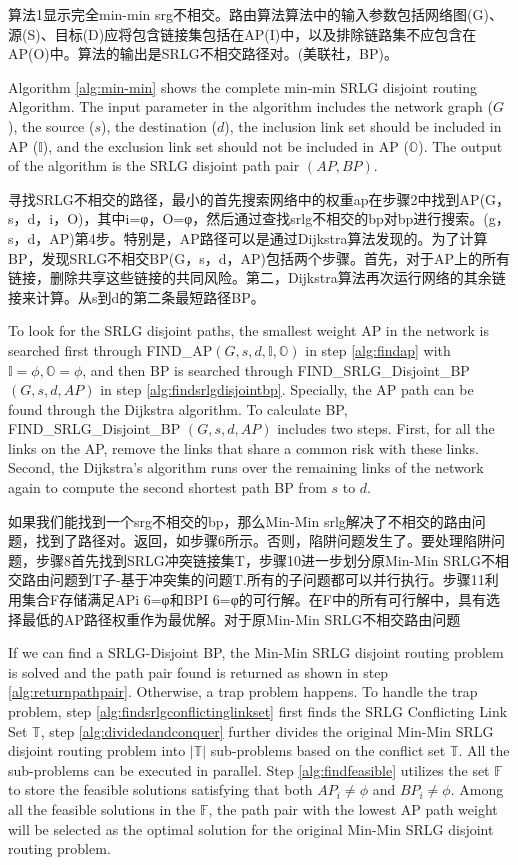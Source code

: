 算法1显示完全min-min srg不相交。路由算法算法中的输入参数包括网络图(G)、源(S)、目标(D)应将包含链接集包括在AP(I)中，以及排除链路集不应包含在AP(O)中。算法的输出是SRLG不相交路径对。(美联社，BP)。

Algorithm \ref{alg:min-min} shows the complete min-min SRLG disjoint routing Algorithm. The input parameter in the algorithm includes  the network graph ($G$), the source ($s$), the destination  ($d$), the inclusion link set should be included in AP ($\mathbb{I}$), and the exclusion link set should not be included in AP ($\mathbb{O}$). The output of the algorithm is the SRLG disjoint path pair $(AP,BP)$.


寻找SRLG不相交的路径，最小的首先搜索网络中的权重ap在步骤2中找到AP(G，s，d，i，O)，其中i=φ，O=φ，然后通过查找srlg不相交的bp对bp进行搜索。(g，s，d，AP)第4步。特别是，AP路径可以是通过Dijkstra算法发现的。为了计算BP，发现SRLG不相交BP(G，s，d，AP)包括两个步骤。首先，对于AP上的所有链接，删除共享这些链接的共同风险。第二，Dijkstra算法再次运行网络的其余链接来计算。从s到d的第二条最短路径BP。


To look for the SRLG disjoint paths, the smallest weight AP in the network is searched  first through FIND\_AP$(G,s,d, \mathbb{I},\mathbb{O})$ in step \ref{alg:findap} with $\mathbb{I}=\phi,\mathbb{O}=\phi$, and then BP is searched through  FIND\_SRLG\_Disjoint\_BP
$(G,s,d,AP)$ in step \ref{alg:findsrlgdisjointbp}. Specially, the AP path can be found through the Dijkstra algorithm. To calculate BP, FIND\_SRLG\_Disjoint\_BP
$(G,s,d,AP)$ includes two steps. First, for all the links on the AP, remove the links that share a common risk with these links. Second, the Dijkstra's algorithm runs over the remaining links of the network again to compute the second shortest path BP from $s$ to $d$.


如果我们能找到一个srg不相交的bp，那么Min-Min srlg解决了不相交的路由问题，找到了路径对。返回，如步骤6所示。否则，陷阱问题发生了。要处理陷阱问题，步骤8首先找到SRLG冲突链接集T，步骤10进一步划分原Min-Min SRLG不相交路由问题到T子-基于冲突集的问题T.所有的子问题都可以并行执行。步骤11利用集合F存储满足APi 6=φ和BPI 6=φ的可行解。在F中的所有可行解中，具有选择最低的AP路径权重作为最优解。对于原Min-Min SRLG不相交路由问题


If we can find a SRLG-Disjoint BP, the Min-Min SRLG disjoint routing problem is solved and  the path pair found is returned as shown in step \ref{alg:returnpathpair}. Otherwise, a trap problem happens. To handle the trap problem, step  \ref{alg:findsrlgconflictinglinkset} first finds the SRLG Conflicting Link Set $\mathbb{T}$, step \ref{alg:dividedandconquer} further divides the original  Min-Min SRLG disjoint routing problem into $\left| \mathbb{T} \right|$ sub-problems based on the conflict set $\mathbb{T}$. All the sub-problems can be executed in parallel. Step \ref{alg:findfeasible} utilizes the set $\mathbb{F}$ to store the feasible solutions  satisfying that  both $A{P_i} \ne \phi$ and $B{P_i} \ne \phi$. Among all the feasible solutions in the $\mathbb{F}$, the path pair with the lowest AP path weight will be selected as the optimal solution for the original Min-Min SRLG disjoint routing problem.


